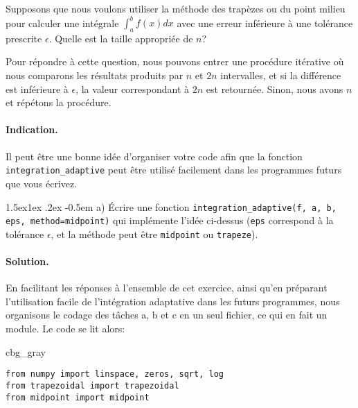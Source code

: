 \documentclass[%
oneside,                 %
final,                   %
10pt,french]{article}
\makeatletter
\newenvironment{_cod_tight}[1]{
   \def\FrameCommand{\colorbox{#1}}
   \FrameRule0.6pt\MakeFramed {\FrameRestore}\vskip3mm}
   {\vskip0mm\endMakeFramed}
\newenvironment{cod}[1]{
\bgroup\rmfamily
\fboxsep=0mm\relax
\begin{_cod_tight}{#1}
\list{}{\parsep=-2mm\parskip=0mm\topsep=0pt\leftmargin=2mm
\rightmargin=2\leftmargin\leftmargin=4pt\relax}
\item\relax}
{\endlist\end{_cod_tight}\egroup}
\newenvironment{doconceexercise}{}{}
\newcounter{doconceexercisecounter}
\newcommand\subex{\@startsection{paragraph}{4}{\z@}%
                  {1.5ex\@plus1ex \@minus.2ex}%
                  {-0.5em}%
                  {\normalfont\normalsize\bfseries}}
\makeatother
\begin{document}


\begin{doconceexercise}


\label{ex:adaptatif}

Supposons que nous voulons utiliser la méthode des trapèzes ou du point milieu pour calculer une intégrale $\int_a^b f(x)dx$ avec une erreur inférieure à une tolérance prescrite $\epsilon$. Quelle est la taille appropriée de $n$?

Pour répondre à cette question, nous pouvons entrer une procédure itérative où nous comparons les résultats produits par $n$ et $2n$ intervalles, et si la différence est inférieure à $\epsilon$, la valeur correspondant à $2n$ est retournée. Sinon, nous avons $n$ et répétons la procédure.


\paragraph{Indication.}
Il peut être une bonne idée d'organiser votre code afin que la fonction \Verb!integration_adaptive! peut être utilisé facilement dans les programmes futurs que vous écrivez.



\subex{a)}
Écrire une fonction \Verb!integration_adaptive(f, a, b, eps, method=midpoint)! qui implémente l'idée ci-dessus (\texttt{eps} correspond à la tolérance $\epsilon$, et la méthode peut être \texttt{midpoint} ou \texttt{trapeze}).


\paragraph{Solution.}
En facilitant les réponses à l'ensemble de cet exercice, ainsi qu'en préparant l'utilisation facile de l'intégration adaptative dans les futurs programmes, nous organisons le codage des tâches a, b et c en un seul fichier, ce qui en fait un module. Le code se lit alors:
\begin{cod}{cbg_gray}\begin{verbatim}
from numpy import linspace, zeros, sqrt, log
from trapezoidal import trapezoidal
from midpoint import midpoint


\end{verbatim}
\end{cod}
\end{doconceexercise}
\end{document}
